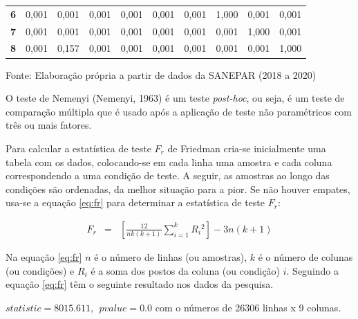 \begin{table}[H]
\begin{tabular}{@{}clllllllll@{}}
		\textbf{6}                           & 0,001                          & 0,001                          & 0,001                          & 0,001                          & 0,001                          & 0,001                          & 1,000                          & 0,001                          & 0,001                          \\
		\textbf{7}                           & 0,001                          & 0,001                          & 0,001                          & 0,001                          & 0,001                          & 0,001                          & 0,001                          & 1,000                          & 0,001                          \\
		\textbf{8}                           & 0,001                          & 0,157                          & 0,001                          & 0,001                          & 0,001                          & 0,001                          & 0,001                          & 0,001                          & 1,000                          \\ \bottomrule
	\end{tabular}

Fonte: Elaboração própria a partir de dados da SANEPAR (2018 a 2020)
\end{table}

O teste de Nemenyi (Nemenyi, 1963) é um teste \textit{post-hoc}, ou seja, é um teste de comparação múltipla que é usado após a aplicação de teste não paramétricos com três ou mais fatores.
    
Para calcular a estatística de teste $F_r$ de Friedman cria-se inicialmente uma tabela com os dados, colocando-se em cada linha uma amostra e cada coluna correspondendo a uma condição de teste. A seguir, as amostras ao longo das condições são ordenadas, da melhor situação para a pior. Se não houver empates, usa-se a equação \eqref{eq:fr} para determinar a estatística de teste $F_r$:

\begin{eqnarray}
	F_r&=&\left[\frac{12}{n k(k+1)} \sum_{i=1}^k R_i{ }^2\right]-3 n(k+1)\label{eq:fr}
\end{eqnarray}
  
  Na equação \eqref{eq:fr} $n$ é o número de linhas (ou amostras), $k$ é o número de colunas (ou condições) e $R_i$ é a soma dos postos da coluna (ou condição) $i$.   
 Seguindo a equação \eqref{eq:fr} têm o seguinte resultado nos dados da pesquisa.
 
 $statistic=8015.611,\ \ pvalue=0.0$ com o números de 26306 linhas x 9 colunas.
 
